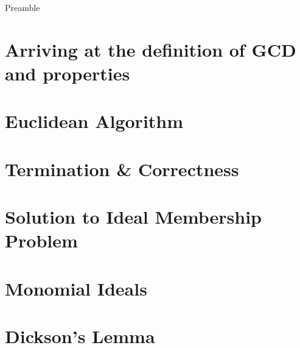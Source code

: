 \noindent
Preamble


\section{Arriving at the definition of GCD and properties}

\section{Euclidean Algorithm}

\section{Termination \& Correctness}

\section{Solution to Ideal Membership Problem}

\section{Monomial Ideals}

\section{Dickson's Lemma}
